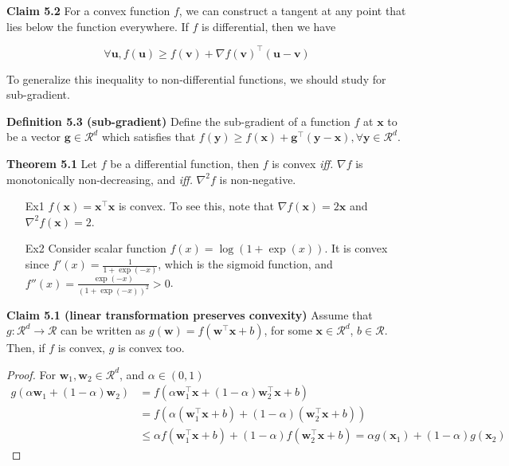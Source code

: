 \documentclass{article}
\newtheorem*{proof}{Proof}
\begin{document}
	\textbf{Claim 5.2} For a convex function $f$, we can construct a tangent at any point that lies below the function everywhere. If $f$ is differential, then we have 
	
	$$\forall \mathbf{u}, f(\mathbf{u})\geq f(\mathbf{v}) + \nabla f(\mathbf{v})^\top (\mathbf{u} - \mathbf{v})$$

	To generalize this inequality to non-differential functions, we should study for sub-gradient. 
	
	\textbf{Definition 5.3 (sub-gradient)} Define the sub-gradient of a function $f$ at $\mathbf{x}$ to be a vector $\mathbf{g}\in\mathcal{R}^d$ which satisfies that $f(\mathbf{y}) \geq f(\mathbf{x}) + \mathbf{g}^\top (\mathbf{y}-\mathbf{x}), \forall \mathbf{y}\in\mathcal{R}^d$.
	
	\textbf{Theorem 5.1} Let $f$ be a differential function, then $f$ is convex \textit{iff.} $\nabla f$ is monotonically non-decreasing, and \textit{iff.} $\nabla^2 f$ is non-negative.

	\begin{itemize}
	\item[Ex1] $f(\mathbf{x})=\mathbf{x}^\top\mathbf{x}$ is convex. To see this, note that $\nabla f(\mathbf{x})=2\mathbf{x}$ and $\nabla^2 f(\mathbf{x}) = 2$.
	\item[Ex2] Consider scalar function $f(x)=\log(1+\exp(x))$. It is convex since $f'(x)=\frac{1}{1+\exp(-x)}$, which is the sigmoid function, and $f''(x)=\frac{\exp(-x)}{(1+\exp(-x))^2}>0$.
	\end{itemize}
	
	\textbf{Claim 5.1 (linear transformation preserves convexity)} Assume that $g:\mathcal{R}^d\rightarrow\mathcal{R}$ can be written as $g(\mathbf{w}) = f(\mathbf{w}^\top \mathbf{x} + b)$, for some $\mathbf{x}\in\mathcal{R}^d$, $b\in\mathcal{R}$. Then, if $f$ is convex, $g$ is convex too.
	
	\begin{proof} For $\mathbf{w}_1, \mathbf{w}_2 \in \mathcal{R}^d$, and $\alpha \in (0,1)$
	\begin{equation*}
	\begin{split}
	g(\alpha \mathbf{w}_1 + (1-\alpha) \mathbf{w}_2) &= f(\alpha \mathbf{w}_1^\top \mathbf{x} + (1-\alpha) \mathbf{w}_2^\top \mathbf{x} + b) \\
	&= f(\alpha (\mathbf{w}_1^\top \mathbf{x}+b) + (1-\alpha) (\mathbf{w}_2^\top \mathbf{x} + b))  \\
	&\leq \alpha  f(\mathbf{w}_1^\top \mathbf{x}+b) + (1-\alpha) f (\mathbf{w}_2^\top \mathbf{x} + b)
	= \alpha g(\mathbf{x}_1) + (1-\alpha) g(\mathbf{x}_2)
	\end{split}
	\end{equation*}
	\end{proof}
	
\end{document}
